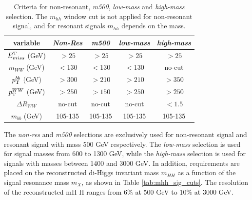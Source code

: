 \begin{table}
\begin{center}
\begin{tabular}{c|c|c|c|c}
 variable & \emph{Non-Res} & \emph{m500} & \emph{low-mass} & \emph{high-mass}\\
\hline
$E^{\rm T}_{miss}$ (GeV)		&$> 25$&$>25$&$> 25$& $> 25$ \\
$m_{WW}$ (GeV) 	   		&$< 130$ &$< 130$ & $< 130$& no-cut\\
$p_{\rm T}^{bb}$ (GeV) 		&$> 300$& $> 210$&$> 210$&$> 350$\\
$p_{\rm T}^{WW}$ (GeV) 		&$> 250$&$> 150$&$> 250$&$> 250$ \\
$\Delta R_{WW}$  		&no-cut& no-cut&no-cut&$<1.5$\\
$m_{bb}$ (GeV)   		&105-135&105-135&105-135&105-135\\
\end{tabular}
\caption{Criteria for non-resonant, \emph{m500}, \emph{low-mass} and 
    \emph{high-mass} selection. The $m_{hh}$ window cut is not applied for 
    non-resonant signal, and for resonant signals $m_{hh}$ depends on 
    the mass.} 
\label{tab:sig_reg_summary}
\end{center}
\end{table}


The \textit{non-res} and \textit{m500} selections are exclusively used for non-resonant signal and resonant signal with mass 500 GeV respectively. The \textit{low-mass} selection is used for signal masses from 600 to 1300 GeV, while the \textit{high-mass} selection is used for signals with masses between 1400 and 3000 GeV. In addition, requirements are placed on the reconstructed di-Higgs invariant mass ${m_{HH}}$ as a function of the signal resonance mass ${m_{X}}$, as shown in Table \ref{tab:mhh_sig_cuts}. The resolution of the reconstructed mH H ranges from 6\% at 500 GeV to 10\% at 3000 GeV.

